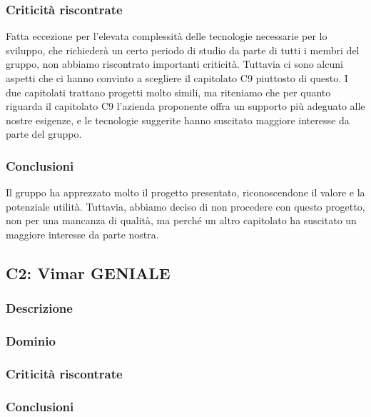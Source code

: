 \subsubsection{Criticità riscontrate}
Fatta eccezione per l’elevata complessità delle tecnologie necessarie per lo sviluppo, 
che richiederà un certo periodo di studio da parte di tutti i membri del gruppo, 
non abbiamo riscontrato importanti criticità. 
Tuttavia ci sono alcuni aspetti che ci hanno convinto a scegliere il capitolato C9 piuttosto di questo. 
I due capitolati trattano progetti molto simili, ma riteniamo che per quanto riguarda il capitolato C9 
l’azienda proponente offra un supporto più adeguato alle nostre esigenze, 
e le tecnologie suggerite hanno suscitato maggiore interesse da parte del gruppo.
\subsubsection{Conclusioni}
Il gruppo ha apprezzato molto il progetto presentato, 
riconoscendone il valore e la potenziale utilità. 
Tuttavia, abbiamo deciso di non procedere con questo progetto, 
non per una mancanza di qualità, ma perché un altro capitolato ha suscitato un maggiore interesse da parte nostra.

\subsection{C2: Vimar GENIALE}

\subsubsection{Descrizione}

\subsubsection{Dominio}

\subsubsection{Criticità riscontrate}

\subsubsection{Conclusioni}